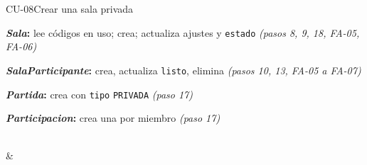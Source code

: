 \begin{fichacu}{CU-08}{Crear una sala privada}
{\begin{cudatos}
      \item \textbf{\textit{Sala}:} lee códigos en uso; crea; actualiza ajustes y \texttt{estado} \textit{(pasos 8, 9, 18, \mbox{FA-05}, \mbox{FA-06})}
      \item \textbf{\textit{SalaParticipante}:} crea, actualiza \texttt{listo}, elimina \textit{(pasos 10, 13, \mbox{FA-05} a \mbox{FA-07})}
      \item \textbf{\textit{Partida}:} crea con \texttt{tipo} \texttt{PRIVADA} \textit{(paso 17)}
      \item \textbf{\textit{Participacion}:} crea una por miembro \textit{(paso 17)}
    \end{cudatos}} \\
   &  \\ \hline
\end{fichacu}
\clearpage
